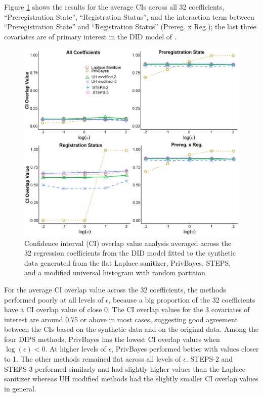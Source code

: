 \documentclass[12pt, A4]{article}
\theoremstyle{plain}
\theoremstyle{exampstyle}\newtheorem{defn}{Definition}
\theoremstyle{exampstyle}\newtheorem{lem}{Lemma}
\theoremstyle{exampstyle}\newtheorem{cor}{Corollary}
\theoremstyle{exampstyle}\newtheorem{pro}{Proposition}
\theoremstyle{exampstyle}\newtheorem{cla}{Claim}
\theoremstyle{exampstyle}\newtheorem{rem}{Remark}
\begin{document}
Figure \ref{fig:DID} shows the results for the average CIs across all 32 coefficients, ``Preregistration State'', ``Registration Status'', and the interaction term between ``Preregistration State'' and ``Registration Status'' (Prereg. x Reg.); the last three covariates are of primary interest in the DID model of \citet{Holbein2016}. 

\begin{figure}[!htb]
\centerline{\includegraphics[width=5in]{DID2.png}}
\vspace{-6pt}\caption{Confidence interval (CI) overlap value analysis averaged across the 32 regression coefficients from the DID model fitted to the synthetic data generated from the flat Laplace sanitizer, PrivBayes, STEPS, and a modified universal histogram with random partition.} \label{fig:DID}
\end{figure}

For the average CI overlap value across the 32 coefficients, the methods performed poorly at all levels of $\epsilon$, because a big proportion of the 32 coefficients have a CI overlap value of close 0. The CI overlap values for the 3 covariates of interest are around 0.75 or above in most cases, suggesting good agreement between the CIs based on the synthetic data and on the original data. Among the four DIPS methods, PrivBayes has the lowest CI overlap values when $\log(\epsilon) < 0$. At higher levels of $\epsilon$, PrivBayes performed better with values closer to 1. The other methods remained flat across all levels of $\epsilon$. STEPS-2 and STEPS-3 performed similarly and had slightly higher values than the Laplace sanitizer whereas UH modified methods had the slightly smaller CI overlap values in general.
\end{document}
